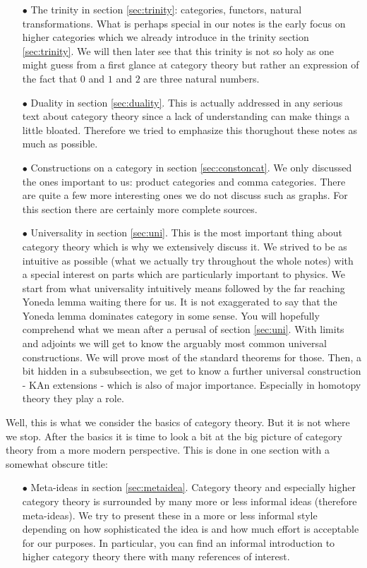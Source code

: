 \begin{enumerate}
\item[$\bullet$]
The trinity in section \ref{sec:trinity}: categories, functors, natural transformations. What is perhaps special in our notes is the early focus on higher categories which we already introduce in the trinity section \ref{sec:trinity}. We will then later see that this trinity is not so {\glqq}holy{\grqq} as one might guess from a first glance at category theory but rather an expression of the fact that $0$ and $1$ and $2$ are three natural numbers. 
\item[$\bullet$]
Duality in section \ref{sec:duality}. This is actually addressed in any serious text about category theory since a lack of understanding can make things a little bloated. Therefore we tried to emphasize this thorughout these notes as much as possible.
\item[$\bullet$]
Constructions on a category in section \ref{sec:constoncat}. We only discussed the ones important to us: product categories and comma categories. There are quite a few more interesting ones we do not discuss such as graphs. For this section there are certainly more complete sources.
\item[$\bullet$]
Universality in section \ref{sec:uni}. This is the most important thing about category theory which is why we extensively discuss it. We strived to be as intuitive as possible (what we actually try throughout the whole notes) with a special interest on parts which are particularly important to physics. We start from what {\glqq}universality{\grqq} intuitively means followed by the far reaching Yoneda lemma waiting there for us. It is not exaggerated to say that the Yoneda lemma dominates category in some sense. You will hopefully comprehend what we mean after a perusal of section \ref{sec:uni}. With limits and adjoints we will get to know the arguably most common {\glqq}universal constructions{\grqq}. We will prove most of the standard theorems for those. Then, a bit hidden in a subsubsection, we get to know a further universal construction - KAn extensions - which is also of major importance. Especially in homotopy theory they play a role.
\end{enumerate}
Well, this is what we consider the basics of category theory. But it is not where we stop. After the basics it is time to look a bit at the big picture of category theory from a more modern perspective. This is done in one section with a somewhat obscure title:
\begin{enumerate}
\item[$\bullet$]
Meta-ideas in section \ref{sec:metaidea}. Category theory and especially higher category theory is surrounded by many more or less informal ideas (therefore meta-ideas). We try to present these in a more or less informal style depending on how sophisticated the idea is and how much effort is acceptable for our purposes. In particular, you can find an informal introduction to higher category theory there with many references of interest.
\end{enumerate}
